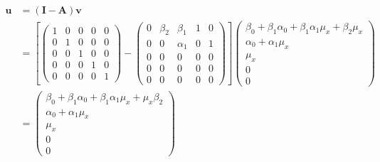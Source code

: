 \documentclass[
]{book}
\theoremstyle{definition}
\theoremstyle{definition}
\theoremstyle{definition}
\theoremstyle{remark}
\begin{document}
\begin{align*}\mathbf{u} &=\left( \mathbf{I} - \mathbf{A} \right) \mathbf{v}\\ &=\left[\left( \begin{array}{ccccc} 1 & 0 & 0 & 0 & 0 \\ 0 & 1 & 0 & 0 & 0 \\ 0 & 0 & 1 & 0 & 0 \\ 0 & 0 & 0 & 1 & 0 \\ 0 & 0 & 0 & 0 & 1 \end{array} \right)-\left( \begin{array}{ccccc} 0 & \beta  _{2} & \beta  _{1} & 1 & 0 \\ 0 & 0 & \alpha  _{1} & 0 & 1 \\ 0 & 0 & 0 & 0 & 0 \\ 0 & 0 & 0 & 0 & 0 \\ 0 & 0 & 0 & 0 & 0 \end{array} \right)\right]\left( \begin{array}{c} \beta  _{0} + \beta  _{1} \alpha  _{0} + \beta  _{1} \alpha  _{1} \mu  _{x} + \beta  _{2} \mu  _{x} \\ \alpha  _{0} + \alpha  _{1} \mu  _{x} \\ \mu  _{x} \\ 0 \\ 0 \end{array} \right)\\ &=\left( \begin{array}{c} \beta  _{0} + \beta  _{1} \alpha  _{0} + \beta  _{1} \alpha  _{1} \mu  _{x} + \mu  _{x} \beta  _{2} \\ \alpha  _{0} + \alpha  _{1} \mu  _{x} \\ \mu  _{x} \\ 0 \\ 0 \end{array} \right)\end{align*}
\end{document}

